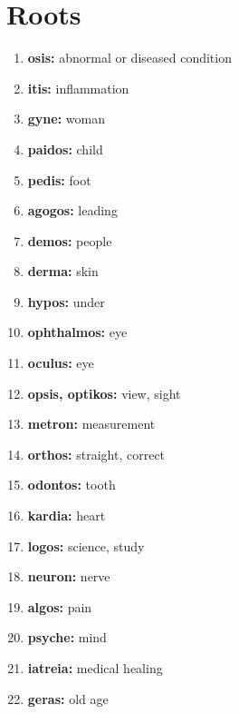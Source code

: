 \documentclass{article}
\begin{document}
\section{Roots}
\begin{enumerate}
    \item \textbf{osis: }{abnormal or diseased condition}
    \item \textbf{itis: }{inflammation}
    \item \textbf{gyne: }{woman}
    \item \textbf{paidos: }{child}
    \item \textbf{pedis: }{foot}
    \item \textbf{agogos: }{leading}
    \item \textbf{demos: }{people}
    \item \textbf{derma: }{skin}
    \item \textbf{hypos: }{under}
    \item \textbf{ophthalmos: }{eye}
    \item \textbf{oculus: }{eye}
    \item \textbf{opsis, optikos: }{view, sight}
    \item \textbf{metron: }{measurement}
    \item \textbf{orthos: }{straight, correct}
    \item \textbf{odontos: }{tooth}
    \item \textbf{kardia: }{heart}
    \item \textbf{logos: }{science, study}
    \item \textbf{neuron: }{nerve}
    \item \textbf{algos: }{pain}
    \item \textbf{psyche: }{mind}
    \item \textbf{iatreia: }{medical healing}
    \item \textbf{geras: }{old age}
    
\end{enumerate}
\end{document}
